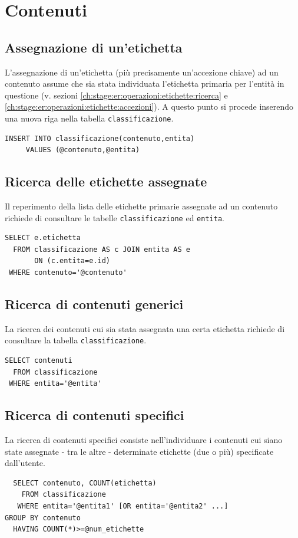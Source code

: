 \documentclass[10pt,a4paper,headinclude,footinclude,hidelinks]{scrreprt} %
\begin{document}
	\section{Contenuti}
	\subsection{Assegnazione di un'etichetta}
	L'assegnazione di un'etichetta (più precisamente un'accezione chiave) ad un contenuto assume che sia stata individuata l'etichetta primaria per l'entità in questione (v. sezioni \ref{ch:stage:er:operazioni:etichette:ricerca} e \ref{ch:stage:er:operazioni:etichette:accezioni}). A questo punto si procede inserendo una nuova riga nella tabella \texttt{classificazione}.
\begin{verbatim}
INSERT INTO classificazione(contenuto,entita)
     VALUES (@contenuto,@entita)
\end{verbatim}

	\subsection{Ricerca delle etichette assegnate}
	Il reperimento della lista delle etichette primarie assegnate ad un contenuto richiede di consultare le tabelle \texttt{classificazione} ed \texttt{entita}.
\begin{verbatim}
SELECT e.etichetta
  FROM classificazione AS c JOIN entita AS e
       ON (c.entita=e.id)
 WHERE contenuto='@contenuto'
\end{verbatim}

	\subsection{Ricerca di contenuti generici}
	La ricerca dei contenuti cui sia stata assegnata una certa etichetta richiede di consultare la tabella \texttt{classificazione}.
\begin{verbatim}
SELECT contenuti
  FROM classificazione
 WHERE entita='@entita'
\end{verbatim}

	\subsection{Ricerca di contenuti specifici}
	La ricerca di contenuti specifici consiste nell'individuare i contenuti cui siano state assegnate - tra le altre - determinate etichette (due o più) specificate dall'utente. 
\begin{verbatim}
  SELECT contenuto, COUNT(etichetta)
    FROM classificazione
   WHERE entita='@entita1' [OR entita='@entita2' ...]
GROUP BY contenuto
  HAVING COUNT(*)>=@num_etichette
\end{verbatim}
\end{document}
